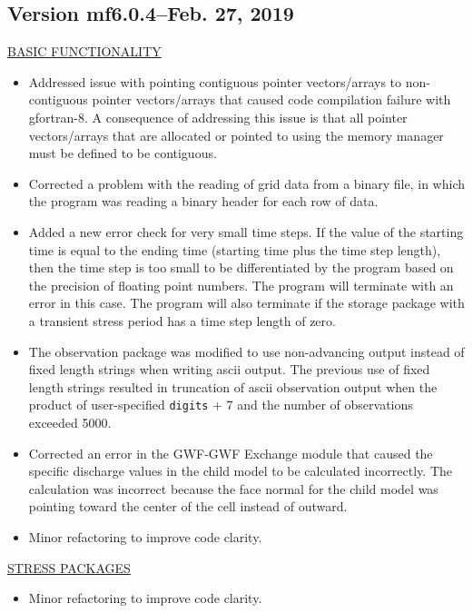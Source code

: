 	\subsection{Version mf6.0.4--Feb. 27, 2019}
	
	\underline{BASIC FUNCTIONALITY}
	\begin{itemize}
		\item Addressed issue with pointing contiguous pointer vectors/arrays to non-contiguous pointer vectors/arrays that caused code compilation failure with gfortran-8. A consequence of addressing this issue is that all pointer vectors/arrays that are allocated or pointed to using the memory manager must be defined to be contiguous.
		\item Corrected a problem with the reading of grid data from a binary file, in which the program was reading a binary header for each row of data.
		\item Added a new error check for very small time steps.  If the value of the starting time is equal to the ending time (starting time plus the time step length), then the time step is too small to be differentiated by the program based on the precision of floating point numbers.  The program will terminate with an error in this case.  The program will also terminate if the storage package with a transient stress period has a time step length of zero.
		\item The observation package was modified to use non-advancing output instead of fixed length strings when writing ascii output. The previous use of fixed length strings resulted in truncation of ascii observation output when the product of user-specified \texttt{digits} + 7 and the number of observations exceeded 5000.
		\item Corrected an error in the GWF-GWF Exchange module that caused the specific discharge values in the child model to be calculated incorrectly.  The calculation was incorrect because the face normal for the child model was pointing toward the center of the cell instead of outward.
		\item Minor refactoring to improve code clarity.
	\end{itemize}
	
	\underline{STRESS PACKAGES}
	\begin{itemize}
		\item Minor refactoring to improve code clarity.
	\end{itemize}
	

